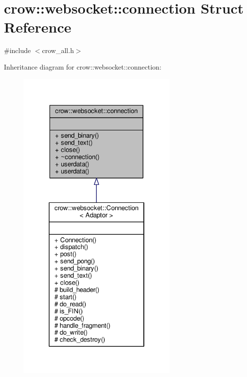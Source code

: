 \hypertarget{structcrow_1_1websocket_1_1connection}{\section{crow\-:\-:websocket\-:\-:connection Struct Reference}
\label{structcrow_1_1websocket_1_1connection}
}


{\ttfamily \#include $<$crow\-\_\-all.\-h$>$}



Inheritance diagram for crow\-:\-:websocket\-:\-:connection\-:
\nopagebreak
\begin{figure}[H]
\begin{center}
\leavevmode
\includegraphics[width=226pt]{structcrow_1_1websocket_1_1connection__inherit__graph}
\end{center}
\end{figure}


